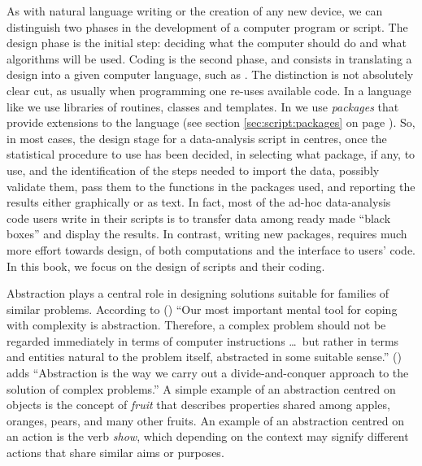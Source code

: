 \documentclass[krantz2]{krantz}\usepackage{knitr}
\begin{document}
As with natural language writing or the creation of any new device, we can distinguish two phases in the development of a computer program or script. The design phase is the initial step: deciding what the computer should do and what algorithms will be used. Coding is the second phase, and consists in translating a design into a given computer language, such as \Rlang. The distinction is not absolutely clear cut, as usually when programming one re-uses available code. In a language like \Cpplang we use libraries of routines, classes and templates. In \Rlang we use \emph{packages} that provide extensions to the language (see section \ref{sec:script:packages} on page \pageref{sec:script:packages}). So, in most cases, the design stage for a data-analysis script in \Rlang centres, once the statistical procedure to use has been decided, in selecting what package, if any, to use, and the identification of the steps needed to import the data, possibly validate them, pass them to the functions in the packages used, and reporting the results either graphically or as text. In fact, most of the ad-hoc data-analysis code users write in their scripts is to transfer data among ready made ``black boxes'' and display the results. In contrast, writing new packages, requires much more effort towards design, of both computations and the interface to users' code. In this book, we focus on the design of scripts and their coding.

Abstraction plays a central role in designing solutions suitable for families of similar problems. According to \citeauthor{Wirth1974} (\citeyear{Wirth1974}) ``Our most important mental tool for coping with complexity is abstraction. Therefore, a complex problem should not be regarded
immediately in terms of computer instructions \ldots\ but rather in terms and entities natural to the problem itself, abstracted in some suitable sense.'' \citeauthor{Zimmer1985} (\citeyear{Zimmer1985}) adds ``Abstraction is the way we carry out a divide-and-conquer approach to the solution of complex problems.'' A simple example of an abstraction centred on objects is the concept of \emph{fruit} that describes properties shared among apples, oranges, pears, and many other fruits. An example of an abstraction centred on an action is the verb \emph{show}, which depending on the context may signify different actions that share similar aims or purposes.
\end{document}
